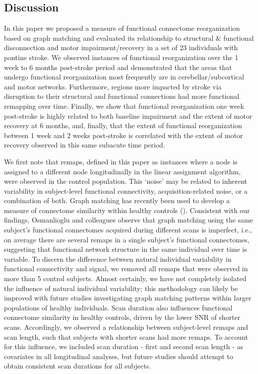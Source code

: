 \documentclass[phd,tocprelim]{cornell}
\begin{document}
\subsection*{Discussion}
	In this paper we proposed a measure of functional connectome reorganization based on graph matching and evaluated its relationship to structural $\&$ functional disconnection and motor impairment/recovery in a set of 23 individuals with pontine stroke. We observed instances of functional reorganization over the 1 week to 6 months post-stroke period and demonstrated that the areas that undergo functional reorganization most frequently are in cerebellar/subcortical and motor networks. Furthermore, regions more impacted by stroke via disruption to their structural and functional connections had more functional remapping over time. Finally, we show that functional reorganization one week post-stroke is highly related to both baseline impairment and the extent of motor recovery at 6 months, and, finally, that the extent of functional reorganization between 1 week and 2 weeks post-stroke is correlated with the extent of motor recovery observed in this same subacute time period.
	
	We first note that remaps, defined in this paper as instances where a node is assigned to a different node longitudinally in the linear assignment algorithm, were observed in the control population. This ‘noise’ may be related to inherent variability in subject-level functional connectivity, acquisition-related noise, or a combination of both. Graph matching has recently been used to develop a measure of connectome similarity within healthy controls (\cite{Osmanlioglu2020-xz}). Consistent with our findings, Osmanlioglu and colleagues observe that graph matching using the same subject’s functional connectomes acquired during different scans is imperfect, i.e., on average there are several remaps in a single subject’s functional connectomes, suggesting that functional network structure in the same individual over time is variable. To discern the difference between natural individual variability in functional connectivity and signal, we removed all remaps that were observed in more than 5 control subjects. Almost certainly, we have not completely isolated the influence of natural individual variability; this methodology can likely be improved with future studies investigating graph matching patterns within larger populations of healthy individuals. Scan duration also influences functional connectome similarity in healthy controls, driven by the lower SNR of shorter scans. Accordingly, we observed a relationship between subject-level remaps and scan length, such that subjects with shorter scans had more remaps. To account for this influence, we included scan duration - first and second scan length - as covariates in all longitudinal analyses, but future studies should attempt to obtain consistent scan durations for all subjects.
	
\end{document}
